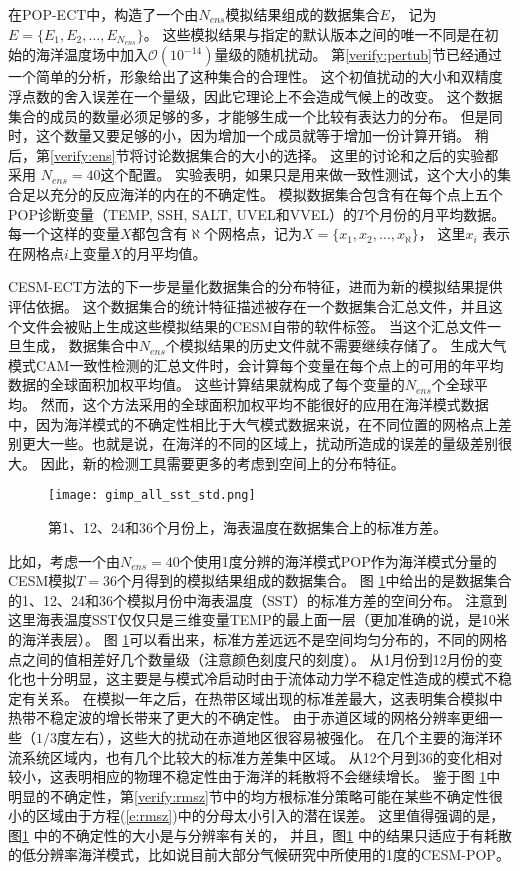  
在POP-ECT中，构造了一个由$N_{ens}$模拟结果组成的数据集合$E$， 记为 $E =\{E_1, E_2, \dots, E_{N_{ens}} \}$。
这些模拟结果与指定的默认版本之间的唯一不同是在初始的海洋温度场中加入$\mathcal{O}(10^{-14})$量级的随机扰动。 
第\ref{verify:pertub}节已经通过一个简单的分析，形象给出了这种集合的合理性。
这个初值扰动的大小和双精度浮点数的舍入误差在一个量级，因此它理论上不会造成气候上的改变。
这个数据集合的成员的数量必须足够的多，才能够生成一个比较有表达力的分布。
但是同时，这个数量又要足够的小，因为增加一个成员就等于增加一份计算开销。 
稍后，第\ref{verify:ens}节将讨论数据集合的大小的选择。
这里的讨论和之后的实验都采用 $N_{ens} = 40$这个配置。
实验表明，如果只是用来做一致性测试，这个大小的集合足以充分的反应海洋的内在的不确定性。
模拟数据集合包含有在每个点上五个POP诊断变量（TEMP, SSH, SALT, UVEL和VVEL）的$T$个月份的月平均数据。
每一个这样的变量$X$都包含有$\aleph$个网格点，记为${X} = \{ x_1, x_2, \dots, x_{\aleph}\}$， 这里$x_i$ 表示在网格点$i$上变量$X$的月平均值。
 
CESM-ECT方法的下一步是量化数据集合的分布特征，进而为新的模拟结果提供评估依据。
这个数据集合的统计特征描述被存在一个数据集合汇总文件，并且这个文件会被贴上生成这些模拟结果的CESM自带的软件标签。
当这个汇总文件一旦生成， 数据集合中$N_{ens}$个模拟结果的历史文件就不需要继续存储了。
生成大气模式CAM一致性检测的汇总文件时，会计算每个变量在每个点上的可用的年平均数据的全球面积加权平均值。
这些计算结果就构成了每个变量的$N_{ens}$个全球平均。 
然而，这个方法采用的全球面积加权平均不能很好的应用在海洋模式数据中，因为海洋模式的不确定性相比于大气模式数据来说，在不同位置的网格点上差别更大一些。也就是说，在海洋的不同的区域上，扰动所造成的误差的量级差别很大。
因此，新的检测工具需要更多的考虑到空间上的分布特征。 

\begin {figure} 
\centering
\texttt{[image: gimp\_all\_sst\_std.png]}
\caption{第1、12、24和36个月份上，海表温度在数据集合上的标准方差。}
\label{fig:SST_STD_all}
\end {figure}

比如，考虑一个由$N_{ens} = 40$个使用1度分辨的海洋模式POP作为海洋模式分量的CESM模拟$T=36$个月得到的模拟结果组成的数据集合。 
图 \ref{fig:SST_STD_all}中给出的是数据集合的1、12、24和36个模拟月份中海表温度（SST）的标准方差的空间分布。
注意到这里海表温度SST仅仅只是三维变量TEMP的最上面一层（更加准确的说，是10米的海洋表层）。
图 \ref{fig:SST_STD_all}可以看出来，标准方差远远不是空间均匀分布的，不同的网格点之间的值相差好几个数量级（注意颜色刻度尺的刻度）。 
从1月份到12月份的变化也十分明显，这主要是与模式冷启动时由于流体动力学不稳定性造成的模式不稳定有关系。  
在模拟一年之后，在热带区域出现的标准差最大，这表明集合模拟中热带不稳定波的增长带来了更大的不确定性\cite{legeckis1977}。
由于赤道区域的网格分辨率更细一些（$1/3$度左右），这些大的扰动在赤道地区很容易被强化。 
在几个主要的海洋环流系统区域内，也有几个比较大的标准方差集中区域。
从12个月到36的变化相对较小，这表明相应的物理不稳定性由于海洋的耗散将不会继续增长。
鉴于图 \ref{fig:SST_STD_all}中明显的不确定性，第\ref{verify:rmsz}节中的均方根标准分策略可能在某些不确定性很小的区域由于方程(\ref{e:rmsz})中的分母太小引入的潜在误差。
这里值得强调的是，图\ref{fig:SST_STD_all} 中的不确定性的大小是与分辨率有关的，
并且，图\ref{fig:SST_STD_all} 中的结果只适应于有耗散的低分辨率海洋模式，比如说目前大部分气候研究中所使用的1度的CESM-POP。

